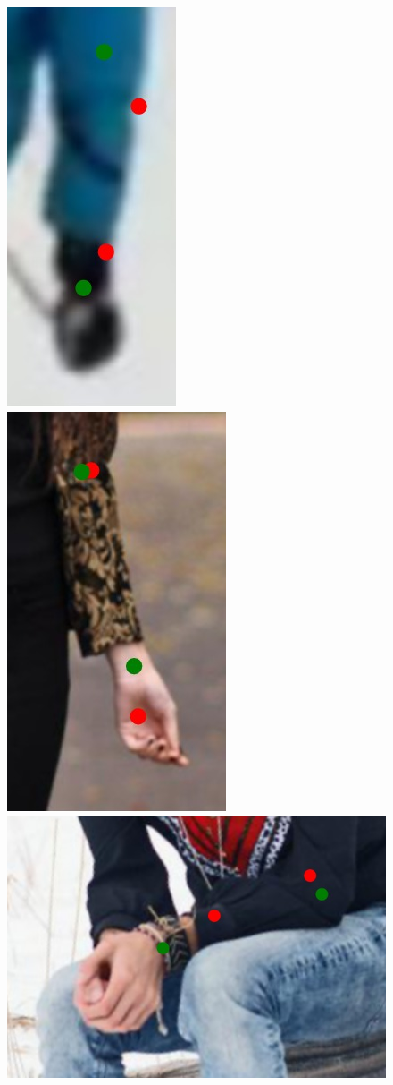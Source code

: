 \begin{figure}[!t]
    \includegraphics[height=\fh]{resources/Annotation_Correction/Fixing/fix_14}
    \hfill
    \includegraphics[height=\fh]{resources/Annotation_Correction/Fixing/fix_15}
    \hfill
    \includegraphics[height=\fh]{resources/Annotation_Correction/Fixing/fix_17}

\end{figure}
